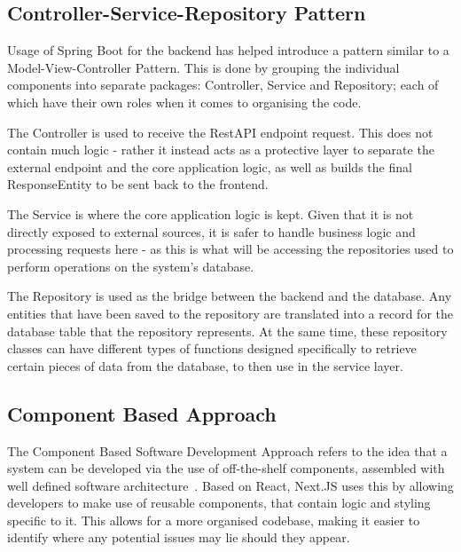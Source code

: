 \documentclass[]{final_report}
\begin{document}
\subsection{Controller-Service-Repository Pattern}

Usage of Spring Boot for the backend has helped introduce a pattern similar to a Model-View-Controller Pattern. This is done by grouping the individual components into separate packages: Controller, Service and Repository; each of which have their own roles when it comes to organising the code.

The Controller is used to receive the RestAPI endpoint request. This does not contain much logic - rather it instead acts as a protective layer to separate the external endpoint and the core application logic, as well as builds the final ResponseEntity to be sent back to the frontend. 

The Service is where the core application logic is kept. Given that it is not directly exposed to external sources, it is safer to handle business logic and processing requests here - as this is what will be accessing the repositories used to perform operations on the system's database.  

The Repository is used as the bridge between the backend and the database. Any entities that have been saved to the repository are translated into a record for the database table that the repository represents. At the same time, these repository classes can have different types of functions designed specifically to retrieve certain pieces of data from the database, to then use in the service layer.

\subsection{Component Based Approach}

The Component Based Software Development Approach refers to the idea that a system can be developed via the use of off-the-shelf components, assembled with well defined software architecture~\cite{GPOUR_COMPONENT}. Based on React, Next.JS uses this by allowing developers to make use of reusable components, that contain logic and styling specific to it. This allows for a more organised codebase, making it easier to identify where any potential issues may lie should they appear.
\end{document}
